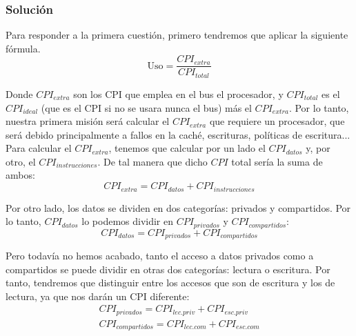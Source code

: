 \documentclass[12pt,a4paper]{article}
\begin{document}
\subsubsection{Solución}
Para responder a la primera cuestión, primero tendremos que aplicar la siguiente fórmula.
\begin{equation}
\text{Uso}=\frac{CPI_{extra}}{CPI_{total}}
\end{equation}

Donde $CPI_{extra}$ son los CPI que emplea en el bus el procesador, y $CPI_{total}$ es el $CPI_{ideal}$ (que es el CPI si no se usara nunca el bus) más el $CPI_{extra}$. Por lo tanto, nuestra primera misión será calcular el $CPI_{extra}$ que requiere un procesador, que será debido principalmente a fallos en la caché, escrituras, políticas de escritura...\\

Para calcular el $CPI_{extra}$, tenemos que calcular por un lado el $CPI_{datos}$ y, por otro, el $CPI_{instrucciones}$. De tal manera que dicho $CPI$ total sería la suma de ambos:
\begin{equation}
CPI_{extra}=CPI_{datos}+CPI_{instrucciones}
\end{equation}

Por otro lado, los datos se dividen en dos categorías: privados y compartidos. Por lo tanto, $CPI_{datos}$ lo podemos dividir en $CPI_{privados}$ y $CPI_{compartidos}$:
\begin{equation}
CPI_{datos}=CPI_{privados}+CPI_{compartidos}
\end{equation}

Pero todavía no hemos acabado, tanto el acceso a datos privados como a compartidos se puede dividir en otras dos categorías: lectura o escritura. Por tanto, tendremos que distinguir entre los accesos que son de escritura y los de lectura, ya que nos darán un CPI diferente:
\begin{align}
CPI_{privados}=CPI_{lec.priv}+CPI_{esc.priv}\\
CPI_{compartidos}=CPI_{lec.com}+CPI_{esc.com}
\end{align}
\end{document}
